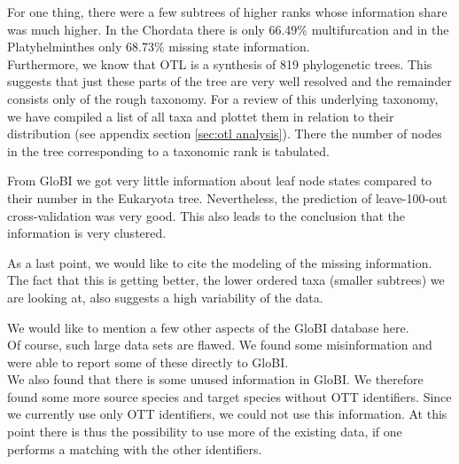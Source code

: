     For one thing, there were a few subtrees of higher ranks whose information share was much higher. 
      In the Chordata there is only 66.49\% multifurcation and in the Platyhelminthes only 68.73\% 
      missing state information. \\
    Furthermore, we know that OTL is a synthesis of 819 phylogenetic trees. This suggests that just 
      these parts of the tree are very well resolved and the remainder consists only of the rough 
      taxonomy. For a review of this underlying taxonomy, we have compiled a list of all taxa and 
      plottet them in relation to their distribution (see appendix section \ref{sec:otl analysis}). 
      There the number of nodes in the tree corresponding to a taxonomic rank is tabulated.

    
    From GloBI we got very little information about leaf node states compared to their number in the 
      Eukaryota tree. Nevertheless, the prediction of leave-100-out cross-validation was very good. 
      This also leads to the conclusion that the information is very clustered.

    As a last point, we would like to cite the modeling of the missing information. The fact that this 
      is getting better, the lower ordered taxa (smaller subtrees) we are looking at, also suggests a 
      high variability of the data.

    We would like to mention a few other aspects of the GloBI database here. \\
    Of course, such large data sets are flawed. We found some misinformation and were able to report 
      some of these directly to GloBI. \\
    We also found that there is some unused information in GloBI. We therefore found some more source 
      species and target species without OTT identifiers. Since we currently use only OTT 
      identifiers, we could not use this information. At this point there is thus the possibility to 
      use more of the existing data, if one performs a matching with the other identifiers.

